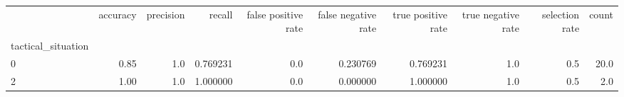 \begin{tabular}{lrrrrrrrrr}
\toprule
{} &  accuracy &  precision &    recall &  false positive rate &  false negative rate &  true positive rate &  true negative rate &  selection rate &  count \\
tactical\_situation &           &            &           &                      &                      &                     &                     &                 &        \\
\midrule
0                  &      0.85 &        1.0 &  0.769231 &                  0.0 &             0.230769 &            0.769231 &                 1.0 &             0.5 &   20.0 \\
2                  &      1.00 &        1.0 &  1.000000 &                  0.0 &             0.000000 &            1.000000 &                 1.0 &             0.5 &    2.0 \\
\bottomrule
\end{tabular}
